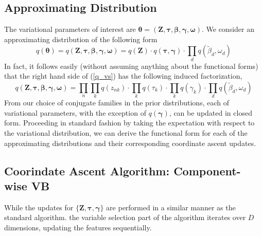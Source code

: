 \documentclass[twoside,11pt]{article}
\newcommand{\boldbeta}{\boldsymbol\beta}
\newcommand{\boldgamma}{\boldsymbol\gamma}
\newcommand{\boldtau}{\boldsymbol\tau}
\newcommand{\betad}{\tilde{\beta}_d}
\begin{document}
\subsection{Approximating Distribution}


The variational parameters of interest are $\boldsymbol \theta = \left(\mathbf{Z}, \boldtau, \boldbeta, \boldgamma, \boldsymbol \omega \right)$. We consider an approximating distribution of the following form
\begin{equation} \label{q_vs}
	q(\boldsymbol \theta) = q \left(\mathbf{Z}, \boldtau, \boldbeta, \boldgamma, \boldsymbol \omega \right) = q(\mathbf{Z}) \cdot q(\boldtau, \boldgamma) \cdot \prod_{d} q(\betad, \omega_d)
\end{equation}
In fact, it follows easily (without assuming anything about the functional forms) that the right hand side of  (\ref{q_vs}) has the following induced factorization, 
\begin{equation} \label{q_vs_fact}
	q \left(\mathbf{Z}, \boldtau, \boldbeta, \boldgamma, \boldsymbol \omega \right) =  \prod_{n} \prod_{k} q(z_{nk}) \cdot \prod_{k} q(\tau_k) \cdot \prod_{k} q(\gamma_k) \cdot \prod_{d} q(\betad, \omega_d)
\end{equation}
From our choice of conjugate families in the prior distributions, each of variational parameters, with the exception of $q \left( \boldgamma \right)$, can be updated in closed form. Proceeding in standard fashion by taking the expectation with respect to the variational distribution, we can derive the functional form for each of the approximating distributions and their corresponding coordinate ascent updates. \\



\subsection{Coorindate Ascent Algorithm: Component-wise VB}
While the updates for $\{\mathbf{Z}, \boldtau, \boldgamma \}$ are performed in a similar manner as the standard algorithm. the variable selection part of the algorithm iterates over $D$ dimensions, updating the features sequentially. \\
\end{document}

